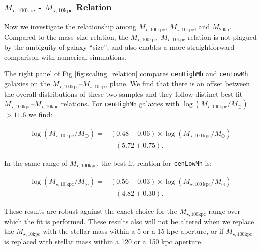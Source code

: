 \documentclass[a4paper,fleqn,usenatbib]{mnras}
\def\rbcg{\texttt{cenHighMh}}
\def\nbcg{\texttt{cenLowMh}}
\def\mhalo{{$M_{\mathrm{200b}}$}}
\def\minn{{$M_{\star,10\mathrm{kpc}}$}}
\def\mtot{{$M_{\star,100\mathrm{kpc}}$}}
\def\logmtot{{$\log (M_{\star,100\mathrm{kpc}}/M_{\odot})$}}
\begin{document}
\subsubsection{\mtot{} - \minn{} Relation}
    \label{sssec:m100_m10}
    
    Now we investigate the relationship among \mtot{}, \minn{}, and \mhalo{}. 
    Compared to the mass--size relation, the \mtot{}--\minn{} relation is not plagued 
    by the ambiguity of galaxy ``size'', and also enables a more straightforward 
    comparison with numerical simulations.
    
    The right panel of Fig \ref{fig:scaling_relation} compares \rbcg{} and \nbcg{}
    galaxies on the \mtot{}--\minn{} plane. 
    We find that there is an offset between the overall distributions of these two
    samples and they follow distinct best-fit \mtot{}--\minn{} relations. 
    For \rbcg{} galaxies with \logmtot{}$>11.6$ we find:
    
    \begin{equation}
        \begin{aligned}
        \log (M_{\star, 10\ \mathrm{kpc}}/M_{\odot}) = & (0.48\pm0.06) \times \log (M_{\star, 100\ \mathrm{kpc}}/M_{\odot}) \\ & +(5.72\pm0.75).
        \end{aligned}
    \end{equation}
    
    \noindent In the same range of \mtot{}, the best-fit relation for \nbcg{} is:
     
    \begin{equation}
        \begin{aligned}
        \log (M_{\star, 10\ \mathrm{kpc}}/M_{\odot}) = & (0.56\pm0.03) \times \log (M_{\star, 100\ \mathrm{kpc}}/M_{\odot}) \\ & +(4.82\pm0.30).
        \end{aligned}
    \end{equation}
    
    These results are robust against the exact choice for the \mtot{} range over which 
    the fit is performed. 
    These results also will not be altered when we replace the \minn{} with the stellar 
    mass within a 5 or a 15 kpc aperture, or if \mtot{} is replaced with stellar mass 
    within a 120 or a 150 kpc aperture.  
    
     
\end{document}
